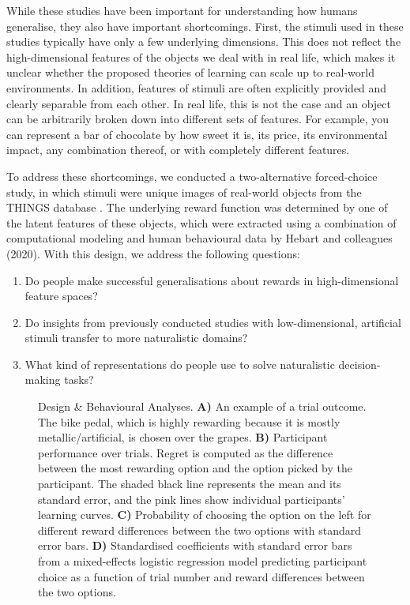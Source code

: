 \documentclass[10pt]{article}
\begin{document}
While these studies have been important for understanding how humans generalise, they also have important shortcomings. First, the stimuli used in these studies typically have only a few underlying dimensions. This does not reflect the high-dimensional features of the objects we deal with in real life, which makes it unclear whether the proposed theories of learning can scale up to real-world environments. In addition, features of stimuli are often explicitly provided and clearly separable from each other. In real life, this is not the case and an object can be arbitrarily broken down into different sets of features. For example, you can represent a bar of chocolate by how sweet it is, its price, its environmental impact, any combination thereof, or with completely different features.

To address these shortcomings, we conducted a two-alternative forced-choice study, in which stimuli were unique images of real-world objects from the THINGS database \citep{hebart_things_2019}. The underlying reward function was determined by one of the latent features of these objects, which were extracted using a combination of computational modeling and human behavioural data by Hebart and colleagues (2020). With this design, we address the following questions: 
\begin{enumerate} 
	\item Do people make successful generalisations about rewards in high-dimensional feature spaces?
	\item Do insights from previously conducted studies with low-dimensional, artificial stimuli transfer to more naturalistic domains?
	\item What kind of representations do people use to solve naturalistic decision-making tasks?
\end{enumerate}

\begin{figure*}[th]
\centering
\resizebox{\textwidth}{!}{}
\caption{Design \& Behavioural Analyses. \textbf{A)} An example of a trial outcome. The bike pedal, which is highly rewarding because it is mostly metallic/artificial, is chosen over the grapes. \textbf{B)} Participant performance over trials. Regret is computed as the difference between the most rewarding option and the option picked by the participant. The shaded black line represents the mean and its standard error, and the pink lines show individual participants' learning curves. \textbf{C)} Probability of choosing the option on the left for different reward differences between the two options with standard error bars. \textbf{D)} Standardised coefficients with standard error bars from a mixed-effects logistic regression model predicting participant choice as a function of trial number and reward differences between the two options. \vspace{-0.5cm}}
\label{fig:Figure1}
\end{figure*}
\end{document}
